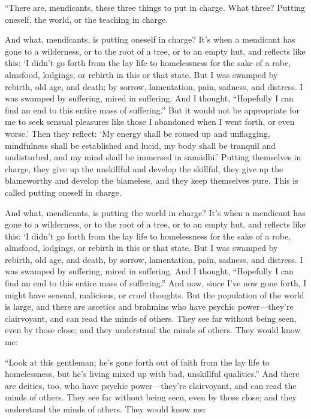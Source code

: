 \documentclass[12pt,openany]{book}%
\begin{document}
“There are, mendicants, these three things to put in charge. What three? Putting oneself, the world, or the teaching in charge. 

And what, mendicants, is putting oneself in charge? It’s when a mendicant has gone to a wilderness, or to the root of a tree, or to an empty hut, and reflects like this: ‘I didn’t go forth from the lay life to homelessness for the sake of a robe, almsfood, lodgings, or rebirth in this or that state. But I was swamped by rebirth, old age, and death; by sorrow, lamentation, pain, sadness, and distress. I was swamped by suffering, mired in suffering. And I thought, “Hopefully I can find an end to this entire mass of suffering.” But it would not be appropriate for me to seek sensual pleasures like those I abandoned when I went forth, or even worse.’ Then they reflect: ‘My energy shall be roused up and unflagging, mindfulness shall be established and lucid, my body shall be tranquil and undisturbed, and my mind shall be immersed in \textsanskrit{samādhi}.’ Putting themselves in charge, they give up the unskillful and develop the skillful, they give up the blameworthy and develop the blameless, and they keep themselves pure. This is called putting oneself in charge. 

And what, mendicants, is putting the world in charge? It’s when a mendicant has gone to a wilderness, or to the root of a tree, or to an empty hut, and reflects like this: ‘I didn’t go forth from the lay life to homelessness for the sake of a robe, almsfood, lodgings, or rebirth in this or that state. But I was swamped by rebirth, old age, and death, by sorrow, lamentation, pain, sadness, and distress. I was swamped by suffering, mired in suffering. And I thought, “Hopefully I can find an end to this entire mass of suffering.” And now, since I’ve now gone forth, I might have sensual, malicious, or cruel thoughts. But the population of the world is large, and there are ascetics and brahmins who have psychic power—they’re clairvoyant, and can read the minds of others. They see far without being seen, even by those close; and they understand the minds of others. They would know me: 

“Look at this gentleman; he’s gone forth out of faith from the lay life to homelessness, but he’s living mixed up with bad, unskillful qualities.” And there are deities, too, who have psychic power—they’re clairvoyant, and can read the minds of others. They see far without being seen, even by those close; and they understand the minds of others. They would know me: 
\end{document}
